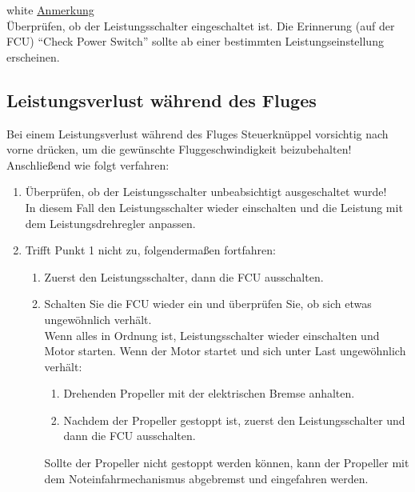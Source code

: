 \begin{color}{white}
\large{\underline{Anmerkung}}\\
Überprüfen, ob der Leistungsschalter eingeschaltet ist. Die Erinnerung (auf der FCU) “Check Power Switch” sollte ab einer bestimmten Leistungseinstellung erscheinen.
\end{color}

\subsection{Leistungsverlust während des Fluges}

Bei einem Leistungsverlust während des Fluges Steuerknüppel vorsichtig nach vorne drücken, um die gewünschte Fluggeschwindigkeit beizubehalten! Anschließend wie folgt verfahren:

\begin{enumerate}
\item Überprüfen, ob der Leistungsschalter unbeabsichtigt ausgeschaltet wurde! \\

In diesem Fall den Leistungsschalter wieder einschalten und die Leistung mit dem
Leistungsdrehregler anpassen.\\
\item Trifft Punkt 1 nicht zu, folgendermaßen fortfahren:\\
\begin{enumerate}
\item Zuerst den Leistungsschalter, dann die FCU ausschalten. \\
\item Schalten Sie die FCU wieder ein und überprüfen Sie, ob sich etwas ungewöhnlich verhält.\\

Wenn alles in Ordnung ist, Leistungsschalter wieder einschalten und Motor starten.
Wenn der Motor startet und sich unter Last ungewöhnlich verhält:
\begin{enumerate}
\item Drehenden Propeller mit der elektrischen Bremse anhalten.
\item Nachdem der Propeller gestoppt ist, zuerst den Leistungsschalter und dann die FCU ausschalten.
\end{enumerate}

Sollte der Propeller nicht gestoppt werden können, kann der Propeller mit dem Noteinfahrmechanismus abgebremst und eingefahren werden.
\end{enumerate}
\end{enumerate}

